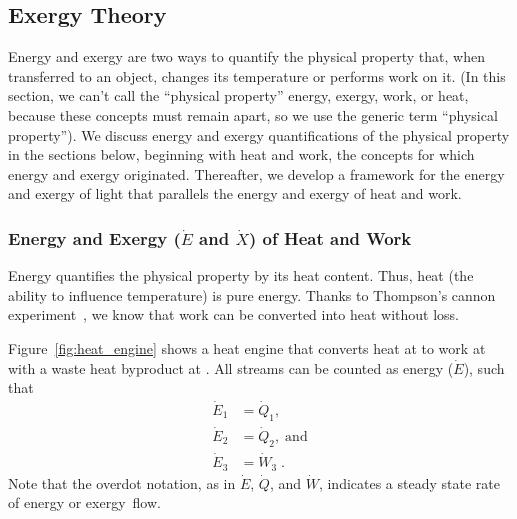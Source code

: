 \documentclass[energies,article,accept,moreauthors,pdftex]{Definitions/mdpi}\usepackage[]{graphicx}\usepackage[]{color}
\newcommand{\enaex}{energy and exergy}
\providecommand{\DIFdelend}{} %
\DeclareRobustCommand{\DIFdelend}{\DIFOaddend \let\includegraphics\DIFOincludegraphics} %
\begin{document}
\DIFdelend %
\subsection{Exergy Theory}
\label{sec:framework}

Energy and exergy are two ways to quantify the physical property that,
when transferred to an object,
changes its temperature or performs work on it.
(In this section, we can't call the ``physical property'' energy, exergy, work, or heat,
because these concepts must remain apart,
so we use the generic term ``physical property'').
We discuss energy and exergy quantifications of the physical property in the sections below, 
beginning with heat and work, 
the concepts for which \enaex{} originated.
Thereafter, we develop a framework for the \enaex{} of light
that parallels the \enaex{} of heat and work.


\subsubsection{Energy and Exergy ($\dot{E}$ and $\dot{X}$) of Heat and Work} 
\label{sec:energy_and_exergy_of_heat_and_work}

Energy quantifies the physical property by its heat content.
Thus, heat (the ability to influence temperature) is pure energy.
Thanks to Thompson's cannon experiment~\cite{Thompson:1798aa}, 
we know that work can be converted into heat without loss.

Figure~\ref{fig:heat_engine} shows a heat engine that converts 
heat at  to 
work at 
with a waste heat byproduct at . 
All streams can be counted as energy ($\dot{E}$), such that 
\begin{align}
  \dot{E}_1 &= \dot{Q}_1, \\
  \dot{E}_2 &= \dot{Q}_2, \; \text{and} \\
  \dot{E}_3 &= \dot{W}_3 \; .
\end{align}
%
Note that the overdot notation, as in $\dot{E}$, $\dot{Q}$, and $\dot{W}$,
indicates a steady state rate of energy or \mbox{exergy flow.}
\end{document}
